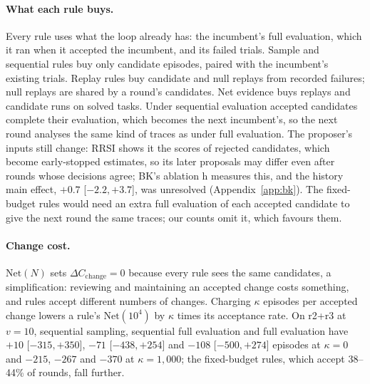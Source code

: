 \documentclass[11pt]{article}
\begin{document}
\begin{table}[t]
\centering
\small
\setlength{\tabcolsep}{3pt}
\caption{Dollar cost of the RRSI loop per trajectory and domain (r4 retail, stopped after two rounds, omitted), its shares, and the evolve episodes sequential full evaluation would have saved, priced at the mean price of a candidate-evaluation episode.}
\label{tab:loopcost}
\end{table}

\paragraph{What each rule buys.} Every rule uses what the loop already has: the incumbent's full evaluation, which it ran when it accepted the incumbent, and its failed trials. Sample and sequential rules buy only candidate episodes, paired with the incumbent's existing trials. Replay rules buy candidate and null replays from recorded failures; null replays are shared by a round's candidates. Net evidence buys replays and candidate runs on solved tasks. Under sequential evaluation accepted candidates complete their evaluation, which becomes the next incumbent's, so the next round analyses the same kind of traces as under full evaluation. The proposer's inputs still change: RRSI shows it the scores of rejected candidates, which become early-stopped estimates, so its later proposals may differ even after rounds whose decisions agree; BK's ablation h measures this, and the history main effect, $+0.7$ [$-2.2,+3.7$], was unresolved (Appendix~\ref{app:bk}). The fixed-budget rules would need an extra full evaluation of each accepted candidate to give the next round the same traces; our counts omit it, which favours them.

\paragraph{Change cost.} $\mathrm{Net}(N)$ sets $\Delta C_{\mathrm{change}}=0$ because every rule sees the same candidates, a simplification: reviewing and maintaining an accepted change costs something, and rules accept different numbers of changes. Charging $\kappa$ episodes per accepted change lowers a rule's $\mathrm{Net}(10^4)$ by $\kappa$ times its acceptance rate. On r2+r3 at $v=10$, sequential sampling, sequential full evaluation and full evaluation have $+10$ [$-315,+350$], $-71$ [$-438,+254$] and $-108$ [$-500,+274$] episodes at $\kappa=0$ and $-215$, $-267$ and $-370$ at $\kappa=1{,}000$; the fixed-budget rules, which accept 38--44\% of rounds, fall further.
\end{document}
